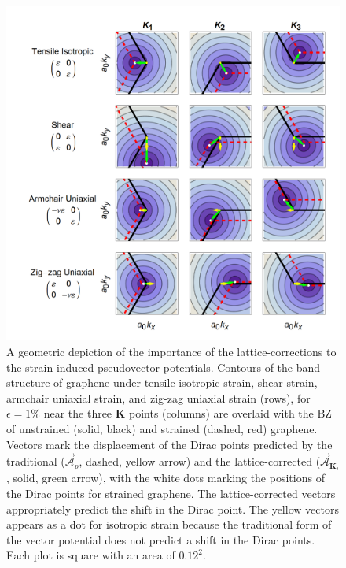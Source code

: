 \begin{figure}
  \begin{center}
  \includegraphics[scale=.75]{Figs_PVP/VPs.png}
  \end{center}
  \caption[Lattice-corrected strain-induced pseudovector potentials]{\label{fig:PVP:PVPshifts}
  A geometric depiction of the importance of the lattice-corrections to the strain-induced pseudovector potentials.
  Contours of the band structure of graphene under tensile isotropic strain, shear strain, armchair uniaxial strain, and zig-zag uniaxial strain (rows), for $\epsilon=1\%$ near the three $\bm{K}$ points (columns) are overlaid with the BZ of unstrained (solid, black) and strained (dashed, red) graphene.
  Vectors mark the displacement of the Dirac points predicted by the traditional ($\vec{\mathcal{A}}_p$, dashed, yellow arrow) and the lattice-corrected ($\vec{\mathcal{A}}_{\bm{K}_{i}}$, solid, green arrow), with the white dots marking the positions of the Dirac points for strained graphene.
  The lattice-corrected vectors appropriately predict the shift in the Dirac point.
  The yellow vectors appears as a dot for isotropic strain because the traditional form of the vector potential does not predict a shift in the Dirac points.
  Each plot is square with an area of $0.12^2$.
  }
\end{figure}

